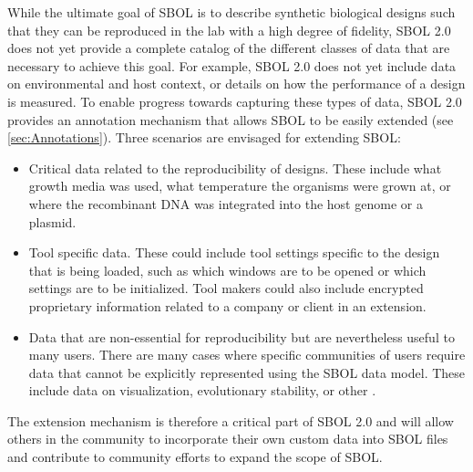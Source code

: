 While the ultimate goal of SBOL is to describe synthetic biological designs such that they can be reproduced in the lab with a high degree of fidelity, SBOL 2.0 does not yet provide a complete catalog of the different classes of data that are necessary to achieve this goal. For example, SBOL 2.0 does not yet include data on environmental and host context, or details on how the performance of a design is measured. To enable progress towards capturing these types of data, SBOL 2.0 provides an annotation mechanism that allows SBOL to be easily extended (see \ref{sec:Annotations}). Three scenarios are envisaged for extending SBOL:

\begin{itemize}
\item Critical data related to the reproducibility of designs. These include  what growth media was used, what temperature the organisms were grown at, or where the recombinant DNA was integrated into the host genome or a plasmid.
\item Tool specific data. These could include tool settings specific to the design that is being loaded, such as which windows are to be opened or which settings are to be initialized. Tool makers could also include encrypted proprietary information related to a company or client in an extension. 
\item Data that are non-essential for  reproducibility but are nevertheless useful to many users. There are many cases where specific communities of users require data that cannot be explicitly represented using the SBOL data model. These include data on visualization, evolutionary stability, or other .
\end{itemize}

The extension mechanism is therefore a critical part of SBOL 2.0 and will allow others in the community to incorporate their own custom data into SBOL files and contribute to community efforts to expand the scope of SBOL.


